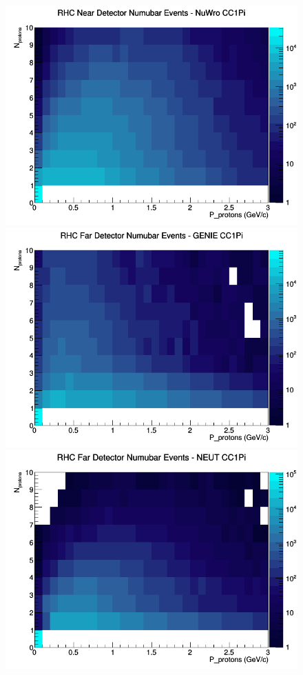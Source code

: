 \documentclass[12pt]{article}
\begin{document}
\begin{figure}[h]
\includegraphics[width=\linewidth]{N_P/nominal/protons/CC1Pi_RHC_ND_numubar_N_P_NuWro.png}
\endminipage
\newline
{}
\includegraphics[width=\linewidth]{N_P/nominal/protons/CC1Pi_RHC_FD_numubar_N_P_GENIE.png}
\endminipage
{}
\includegraphics[width=\linewidth]{N_P/nominal/protons/CC1Pi_RHC_FD_numubar_N_P_NEUT.png}

\end{figure}
\end{document}
